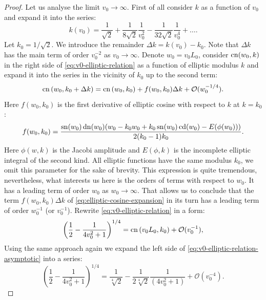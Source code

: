 \begin{proof}
	Let us analyse the limit $v_0 \to \infty$.
	First of all consider $k$ as a function of $v_0$ and expand it into the series:
	\begin{equation}
		k(v_0) = \frac{1}{\sqrt{2}} + \frac{1}{8 \sqrt{2}} \frac{1}{v_0^2} - \frac{1}{32 \sqrt{2}} \frac{1}{v_0^4} + \dots.
	\label{eq:k-series}
	\end{equation}
	Let $k_0 = 1/\sqrt{2}$.
	We introduce the remainder $\Delta k = k(v_0) - k_0$.
	Note that $\Delta k$ has the main term of order $v_0^{-2}$ as $v_0 \to \infty$.
	Denote $w_0 = v_0 L_0$, consider $\mathrm{cn}(w_0, k)$ in the right side of \eqref{eq:v0-elliptic-relation} as a function of elliptic modulus $k$ and expand it into the series in the vicinity of $k_0$ up to the second term:
	\begin{equation}
		\mathrm{cn} \left( w_0, k_0 + \Delta k \right) = \mathrm{cn} \left( w_0, k_0 \right) + f(w_0, k_0) \Delta k + \mathcal{O}(w_0^{-1/4}).
	\label{eq:elliptic-cosine-expansion}
	\end{equation}
	Here $f(w_0, k_0)$ is the first derivative of elliptic cosine with respect to $k$ at $k = k_0$:
	\begin{equation}
		f(w_0, k_0) = \frac{\mathop\mathrm{sn} (w_0) \mathop\mathrm{dn} (w_0) (w_0 - k_0 w_0 + k_0 \mathop\mathrm{sn}(w_0) \mathop\mathrm{cd}(w_0) - E(\phi(w_0))) }{2 (k_0 - 1) k_0} .
	\end{equation}
	Here $\phi(w, k)$ is the Jacobi amplitude and $E(\phi, k)$ is the incomplete elliptic integral of the second kind.
	All elliptic functions have the same modulus $k_0$, we omit this parameter for the sake of brevity.
	This expression is quite tremendous, nevertheless, what interests us here is the orders of terms with respect to $w_0$.
	It has a leading term of order $w_0$ as $w_0 \to \infty$.
	That allows us to conclude that the term $f(w_0, k_0) \Delta k$ of \eqref{eq:elliptic-cosine-expansion} in its turn has a leading term of order $w_0^{-1}$ (or $v_0^{-1}$).
	Rewrite \eqref{eq:v0-elliptic-relation} in a form:
	\begin{equation}
		\left( \frac{1}{2} - \frac{1}{4 v_0^2 + 1} \right)^{1/4} = \mathrm{cn} \left( v_0 L_0, k_0 \right) + \mathcal{O}(v_0^{-1}),
	\label{eq:v0-elliptic-relation-asymptotic}
	\end{equation}
	Using the same approach again we expand the left side of \eqref{eq:v0-elliptic-relation-asymptotic} into a series:
	\begin{equation}
		\left( \frac{1}{2} - \frac{1}{4 v_0^2 + 1} \right)^{1/4} =  \frac{1}{\sqrt[4]{2}} - \frac{1}{2 \sqrt[4]{2}} \frac{1}{(4v_0^2 + 1)} + \mathcal{O}(v_0^{-4}).

\end{equation}
\end{proof}
